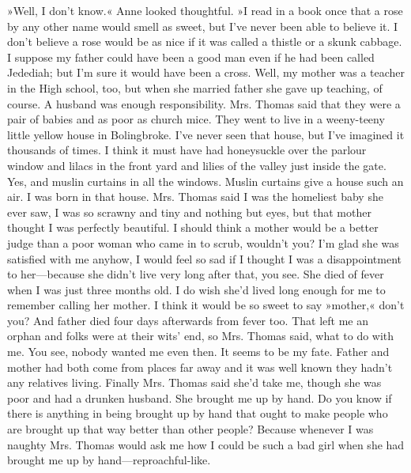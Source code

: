 »Well, I don't know.« Anne looked thoughtful. »I read in a book once that a rose by any other name would smell as sweet, but I've never been able to believe it. I don't believe a rose would be as nice if it was called a thistle or a skunk cabbage. I suppose my father could have been a good man even if he had been called Jedediah; but I'm sure it would have been a cross. Well, my mother was a teacher in the High school, too, but when she married father she gave up teaching, of course. A husband was enough responsibility. Mrs. Thomas said that they were a pair of babies and as poor as church mice. They went to live in a weeny-teeny little yellow house in Bolingbroke. I've never seen that house, but I've imagined it thousands of times. I think it must have had honeysuckle over the parlour window and lilacs in the front yard and lilies of the valley just inside the gate. Yes, and muslin curtains in all the windows. Muslin curtains give a house such an air. I was born in that house. Mrs. Thomas said I was the homeliest baby she ever saw, I was so scrawny and tiny and nothing but eyes, but that mother thought I was perfectly beautiful. I should think a mother would be a better judge than a poor woman who came in to scrub, wouldn't you? I'm glad she was satisfied with me anyhow, I would feel so sad if I thought I was a disappointment to her—because she didn't live very long after that, you see. She died of fever when I was just three months old. I do wish she'd lived long enough for me to remember calling her mother. I think it would be so sweet to say »mother,« don't you? And father died four days afterwards from fever too. That left me an orphan and folks were at their wits' end, so Mrs. Thomas said, what to do with me. You see, nobody wanted me even then. It seems to be my fate. Father and mother had both come from places far away and it was well known they hadn't any relatives living. Finally Mrs. Thomas said she'd take me, though she was poor and had a drunken husband. She brought me up by hand. Do you know if there is anything in being brought up by hand that ought to make people who are brought up that way better than other people? Because whenever I was naughty Mrs. Thomas would ask me how I could be such a bad girl when she had brought me up by hand—reproachful-like.

